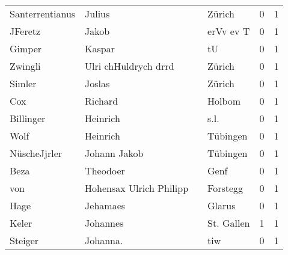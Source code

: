 \begin{center}
\begin{tiny}
\begin{longtabu}{llllrr}
          Santerrentianus &                             Julius &             &                                      Zürich &          0 &         1 \\
                  JFeretz &                              Jakob &             &                                   erVv ev T &          0 &         1 \\
                   Gimper &                             Kaspar &             &                                          tU &          0 &         1 \\
                  Zwingli &               Ulri chHuldrych drrd &             &                                      Zürich &          0 &         1 \\
                   Simler &                             Joslas &             &                                      Zürich &          0 &         1 \\
                      Cox &                            Richard &             &                                      Holbom &          0 &         1 \\
                Billinger &                           Heinrich &             &                                        s.l. &          0 &         1 \\
                     Wolf &                           Heinrich &             &                                    Tübingen &          0 &         1 \\
             NüscheJjrler &                       Johann Jakob &             &                                    Tübingen &          0 &         1 \\
                     Beza &                           Theodoer &             &                                        Genf &          0 &         1 \\
                      von &            Hohensax Ulrich Philipp &             &                                    Forstegg &          0 &         1 \\
                     Hage &                           Jehamaes &             &                                      Glarus &          0 &         1 \\
                    Keler &                           Johannes &             &                                  St. Gallen &          1 &         1 \\
                  Steiger &                           Johanna. &             &                                         tiw &          0 &         1 \\

\end{longtabu}
\end{tiny}
\end{center}
